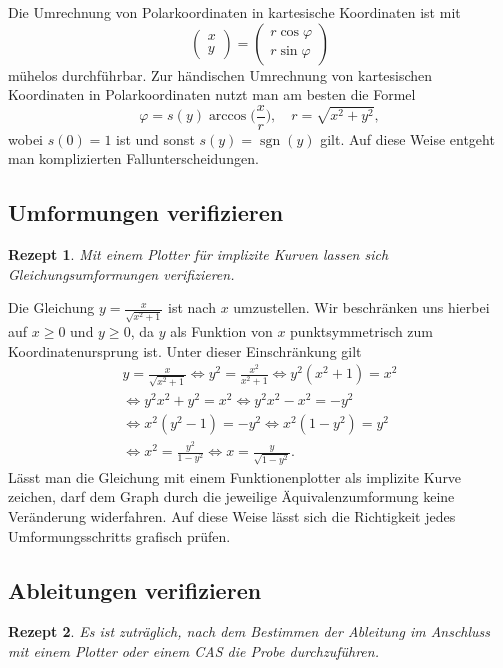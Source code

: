 \documentclass[a4paper,10pt,fleqn,twocolumn,twoside,dvipdfmx]{scrartcl}
\theoremstyle{rmbox}
\newtheorem{Rezept}{Rezept}[section]
\newcommand{\sgn}{\operatorname{sgn}}
\begin{document}
\noindent
Die Umrechnung von Polarkoordinaten in kartesische Koordinaten
ist mit
\[\begin{pmatrix}x\\ y\end{pmatrix}
= \begin{pmatrix}r\cos\varphi\\ r\sin\varphi\end{pmatrix}\]
mühelos durchführbar. Zur händischen Umrechnung von kartesischen
Koordinaten in Polarkoordinaten nutzt man am besten die Formel
\[\varphi = s(y)\arccos\Big(\frac{x}{r}\Big),\quad r=\sqrt{x^2+y^2},\]
wobei $s(0)=1$ ist und sonst $s(y)=\sgn(y)$ gilt. Auf diese
Weise entgeht man komplizierten Fallunterscheidungen.

\subsection{Umformungen verifizieren}

\begin{Rezept}
Mit einem Plotter für implizite Kurven lassen sich
Gleichungsumformungen verifizieren.
\end{Rezept}

\noindent
Die Gleichung $y = \tfrac{x}{\sqrt{x^2+1}}$ ist nach $x$ umzustellen.
Wir beschränken uns hierbei auf $x\ge 0$ und $y\ge 0$, da $y$
als Funktion von $x$ punktsymmetrisch zum Koordinatenursprung ist.
Unter dieser Einschränkung gilt
\begin{gather*}
y = \tfrac{x}{\sqrt{x^2+1}}\iff y^2 = \tfrac{x^2}{x^2+1}
\iff y^2(x^2+1) = x^2\\
\iff y^2 x^2 + y^2 = x^2
\iff y^2 x^2 - x^2 = -y^2\\
\iff x^2 (y^2 - 1) = -y^2
\iff x^2 (1 - y^2) = y^2\\
\iff x^2 = \tfrac{y^2}{1-y^2}
\iff x = \tfrac{y}{\sqrt{1-y^2}}.
\end{gather*}
Lässt man die Gleichung mit einem Funktionenplotter als implizite Kurve
zeichen, darf dem Graph durch die jeweilige Äquivalenzumformung keine
Veränderung widerfahren. Auf diese Weise lässt sich die Richtigkeit
jedes Umformungsschritts grafisch prüfen.

\subsection{Ableitungen verifizieren}

\begin{Rezept}
Es ist zuträglich, nach dem Bestimmen der Ableitung im Anschluss
mit einem Plotter oder einem CAS die Probe durchzuführen.
\end{Rezept}
\end{document}
